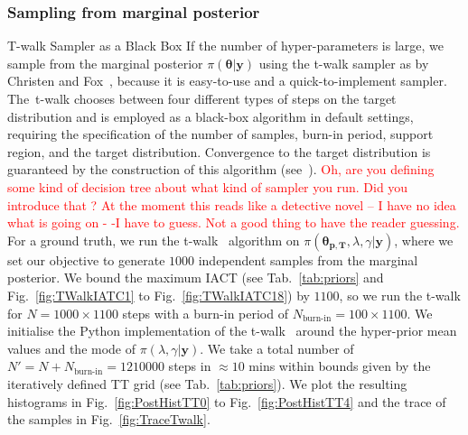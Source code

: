 \subsubsection{Sampling from marginal posterior}
T-walk Sampler as a Black Box
If the number of hyper-parameters is large, we sample from the marginal posterior $\pi(\bm{\theta} | \bm{y})$ using the t-walk sampler as by Christen and Fox~\cite{christen2010general}, because it is easy-to-use and a quick-to-implement sampler.
The~t-walk chooses between four different types of steps on the target distribution and is employed as a black-box algorithm in default settings, requiring the specification of the number of samples, burn-in period, support region, and the target distribution. 
Convergence to the target distribution is guaranteed by the construction of this algorithm (see~\cite{christen2010general}).
\textcolor{red}{Oh, are you defining some kind of decision tree about what kind of sampler you run. Did you introduce that ? At the moment this reads like a detective novel -- I have no idea what is going on - -I have to guess. Not a good thing to have the reader guessing.}
For a ground truth, we run the t-walk~\cite{christen2010general} algorithm on $\pi( \bm{\theta}_{\bm{p}, \bm{T}},\lambda,\gamma  | \bm{y})$, where we set our objective to generate $1000$ independent samples from the marginal posterior.
We bound the maximum IACT (see Tab.~\ref{tab:priors} and Fig.~\ref{fig:TWalkIATC1} to Fig.~\ref{fig:TWalkIATC18}) by $1100$, so we run the t-walk for $N = 1000 \times 1100$ steps with a burn-in period of $N_{\text{burn-in}} = 100 \times 1100 $.
We initialise the Python implementation of the t-walk~\cite{christentwalkaccess} around the hyper-prior mean values and the mode of $\pi(\lambda ,\gamma|\bm{y})$.
We take a total number of $N' =N + N_{\text{burn-in}} = 1210000$ steps in $\approx 10$ mins within bounds given by the iteratively defined TT grid (see Tab.~\ref{tab:priors}).
We plot the resulting histograms in Fig.~\ref{fig:PostHistTT0} to Fig.~\ref{fig:PostHistTT4} and the trace of the samples in Fig.~\ref{fig:TraceTwalk}.

